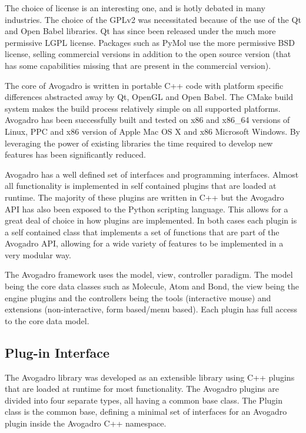\documentclass[10pt]{bmc_article}
\newenvironment{bmcformat}{\begin{raggedright}
\baselineskip20pt\sloppy\setboolean{publ}{false}}{\end{raggedright}
\baselineskip20pt\sloppy}
\begin{document}
\begin{bmcformat}
The choice of license is an interesting one, and is hotly debated in many
industries. The choice of the GPLv2 was necessitated because of the use of the
Qt and Open Babel libraries. Qt has since been released under the much more
permissive LGPL license. Packages such as PyMol use the more permissive BSD
license, selling commercial versions in addition to the open source version
(that has some capabilities missing that are present in the commercial version).

The core of Avogadro is written in portable C++ code with platform specific
differences abstracted away by Qt, OpenGL and Open Babel. The CMake build system
makes the build process relatively simple on all supported platforms. Avogadro
has been successfully built and tested on x86 and x86\_64 versions of Linux, PPC
and x86 version of Apple Mac OS X and x86 Microsoft Windows. By leveraging the
power of existing libraries the time required to develop new features has been
significantly reduced.

Avogadro has a well defined set of interfaces and programming interfaces. Almost
all functionality is implemented in self contained plugins that are loaded at
runtime. The majority of these plugins are written in C++ but the Avogadro API
has also been exposed to the Python scripting language. This allows for a great
deal of choice in how plugins are implemented. In both cases each plugin is a
self contained class that implements a set of functions that are part of the
Avogadro API, allowing for a wide variety of features to be implemented in a
very modular way.

The Avogadro framework uses the model, view, controller paradigm. The model
being the core data classes such as Molecule, Atom and Bond, the view being the
engine plugins and the controllers being the tools (interactive mouse) and
extensions (non-interactive, form based/menu based). Each plugin has full access
to the core data model.

\subsection{Plug-in Interface}

The Avogadro library was developed as an extensible library using C++ plugins
that are loaded at runtime for most functionality. The Avogadro plugins are
divided into four separate types, all having a common base class. The Plugin
class is the common base, defining a minimal set of interfaces for an Avogadro
plugin inside the Avogadro C++ namespace.


\end{bmcformat}
\end{document}
